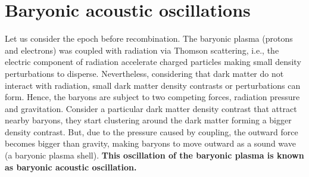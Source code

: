 


\section{ Baryonic acoustic oscillations }

Let us consider the epoch before recombination. The baryonic plasma (protons and electrons) was coupled with radiation via Thomson scattering,  i.e., the electric component of radiation accelerate charged particles making small density perturbations to disperse. Nevertheless,
considering that dark matter do not interact with radiation, small dark matter density contrasts or perturbations can form. Hence, the baryons are 
subject to two competing forces, radiation pressure and gravitation. Consider a particular dark matter density contrast that attract
nearby baryons, they start clustering around the dark matter forming a bigger density contrast. But, due to the pressure caused
by coupling, the outward force becomes bigger than gravity, making baryons to move outward as a sound wave (a baryonic plasma shell). \textbf{This oscillation of the baryonic plasma is known as baryonic acoustic oscillation.} 

